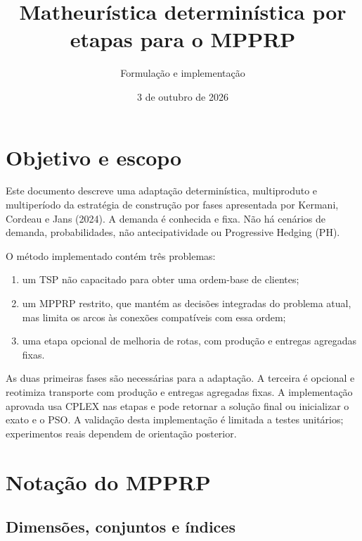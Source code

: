 \documentclass[11pt,a4paper]{article}
\title{Matheurística determinística por etapas para o MPPRP}
\author{Formulação e implementação}
\date{3 de outubro de 2026}
\begin{document}
\maketitle

\section{Objetivo e escopo}

Este documento descreve uma adaptação determinística, multiproduto e multiperíodo da estratégia de construção por fases apresentada por Kermani, Cordeau e Jans (2024). A demanda é conhecida e fixa. Não há cenários de demanda, probabilidades, não antecipatividade ou Progressive Hedging (PH).

O método implementado contém três problemas:
\begin{enumerate}
    \item um TSP não capacitado para obter uma ordem-base de clientes;
    \item um MPPRP restrito, que mantém as decisões integradas do problema atual, mas limita os arcos às conexões compatíveis com essa ordem;
    \item uma etapa opcional de melhoria de rotas, com produção e entregas agregadas fixas.
\end{enumerate}

As duas primeiras fases são necessárias para a adaptação. A terceira é opcional e reotimiza transporte com produção e entregas agregadas fixas. A implementação aprovada usa CPLEX nas etapas e pode retornar a solução final ou inicializar o exato e o PSO. A validação desta implementação é limitada a testes unitários; experimentos reais dependem de orientação posterior.

\section{Notação do MPPRP}
\label{sec:notation}

\subsection{Dimensões, conjuntos e índices}
\end{document}
